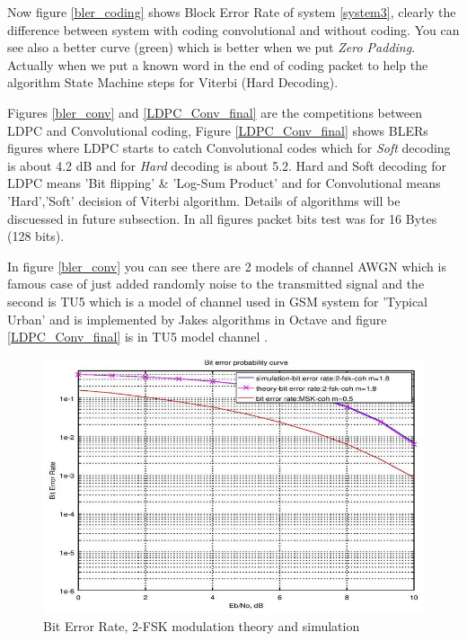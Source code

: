 Now figure \ref{bler_coding} shows Block Error Rate of system \ref{system3}, clearly the difference between system with coding convolutional and without coding. You can see also a better curve (green) which is better when we put \textit{Zero Padding}. Actually when we put a known word in the end of coding packet to help the algorithm State Machine steps for Viterbi (Hard Decoding). 

Figures \ref{bler_conv} and \ref{LDPC_Conv_final} are the competitions between LDPC and Convolutional coding, Figure \ref{LDPC_Conv_final} shows BLERs figures where LDPC starts to catch Convolutional codes which for \textit{Soft} decoding is about 4.2 dB and for \textit{Hard} decoding is about 5.2. Hard and Soft decoding for LDPC means 'Bit flipping' \& 'Log-Sum Product' and for Convolutional means 'Hard','Soft' decision of Viterbi algorithm. Details of algorithms will be discuessed in future subsection. In all figures packet bits test was for 16 Bytes (128 bits).   

In figure \ref{bler_conv} you can see there are 2 models of channel AWGN which is famous case of just added randomly noise to the transmitted signal and the second is TU5 which is a model of channel used in GSM system for 'Typical Urban' and is implemented by Jakes algorithms in Octave and figure \ref{LDPC_Conv_final} is in TU5 model channel \cite{urban}.

\begin{figure}[h]
\centering
\includegraphics[scale=0.8]{Figures/ber.jpg}
\caption{Bit Error Rate, 2-FSK modulation theory and simulation}
\label{ber}
\end{figure}


